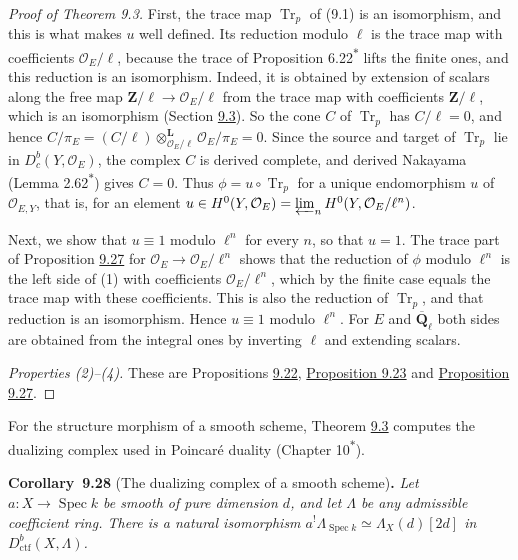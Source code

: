 \documentclass[11pt]{article}
\newenvironment{bpstatement}[2]{\par\addvspace{0.6\baselineskip}\noindent\textbf{#1}#2\textbf{.}\enspace\ignorespaces}
  {\par\addvspace{0.4\baselineskip}}
\newenvironment{bpstatementit}[2]{\begin{bpstatement}{#1}{#2}\itshape\ignorespaces}{\end{bpstatement}}
\newcommand{\bpout}[1]{#1\textsuperscript{\hyperlink{bp-outside}{\ensuremath{\ast}}}}
\providecommand{\Dbc}{}\renewcommand{\Dbc}{D^b_c}
\begin{document}
\begin{proof}[{Proof of Theorem 9.3}]
First, the trace map \(\operatorname{Tr}_p\) of (9.1) is an isomorphism, and this is what makes \(u\) well defined. Its reduction modulo \(\ell\) is the trace map with coefficients \(\mathcal O_E/\ell\), because the trace of Proposition \bpout{6.22} lifts the finite ones, and this reduction is an isomorphism. Indeed, it is obtained by extension of scalars along the free map \(\mathbf Z/\ell\to\mathcal O_E/\ell\) from the trace map with coefficients \(\mathbf Z/\ell\), which is an isomorphism (Section \hyperref[bp15]{9.3}). So the cone \(C\) of \(\operatorname{Tr}_p\) has \(C/\ell=0\), and hence \(C/\pi_E=(C/\ell)\otimes^{\mathbf L}_{\mathcal O_E/\ell}\mathcal O_E/\pi_E=0\). Since the source and target of \(\operatorname{Tr}_p\) lie in \(\Dbc(Y,\mathcal O_E)\), the complex \(C\) is derived complete, and derived Nakayama (Lemma \bpout{2.62}) gives \(C=0\). Thus \(\phi=u\circ\operatorname{Tr}_p\) for a unique endomorphism \(u\) of \(\mathcal O_{E,Y}\), that is, for an element \(u\in H^0(Y,\mathcal O_E)=\varprojlim_nH^0(Y,\mathcal O_E/\ell^n)\).

Next, we show that \(u\equiv1\) modulo \(\ell^n\) for every \(n\), so that \(u=1\). The trace part of Proposition \hyperref[bp90]{9.27} for \(\mathcal O_E\to\mathcal O_E/\ell^n\) shows that the reduction of \(\phi\) modulo \(\ell^n\) is the left side of (1) with coefficients \(\mathcal O_E/\ell^n\), which by the finite case equals the trace map with these coefficients. This is also the reduction of \(\operatorname{Tr}_p\), and that reduction is an isomorphism. Hence \(u\equiv1\) modulo \(\ell^n\). For \(E\) and \(\overline{\mathbf Q}_\ell\) both sides are obtained from the integral ones by inverting \(\ell\) and extending scalars.

\emph{Properties (2)–(4).} These are Propositions \hyperref[bp76]{9.22}, \hyperref[bp79]{Proposition 9.23} and \hyperref[bp90]{Proposition 9.27}.
\end{proof}

\label{bp95}%
For the structure morphism of a smooth scheme, Theorem \hyperref[bp9]{9.3} computes the dualizing complex used in Poincaré duality (Chapter \bpout{10}).

\label{bp96}%
\begin{bpstatementit}{Corollary~9.28}{ (The dualizing complex of a smooth scheme)}
Let \(a:X\to\operatorname{Spec}k\) be smooth of pure dimension \(d\), and let \(\Lambda\) be any admissible coefficient ring. There is a natural isomorphism \(a^!\Lambda_{\operatorname{Spec}k}\simeq\Lambda_X(d)[2d]\) in \(D^b_{\mathrm{ctf}}(X,\Lambda)\).
\end{bpstatementit}
\end{document}
